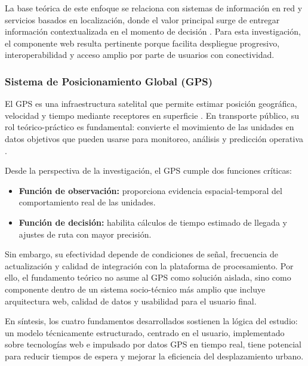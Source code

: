La base teórica de este enfoque se relaciona con sistemas de información en red y servicios basados en localización, donde el valor principal surge de entregar información contextualizada en el momento de decisión \cite{varshney2002}. Para esta investigación, el componente web resulta pertinente porque facilita despliegue progresivo, interoperabilidad y acceso amplio por parte de usuarios con conectividad.

\subsubsection{Sistema de Posicionamiento Global (GPS)}

El GPS es una infraestructura satelital que permite estimar posición geográfica, velocidad y tiempo mediante receptores en superficie \cite{elrabbany2006}. En transporte público, su rol teórico-práctico es fundamental: convierte el movimiento de las unidades en datos objetivos que pueden usarse para monitoreo, análisis y predicción operativa \cite{schiller2004,gonzalez2004}.

Desde la perspectiva de la investigación, el GPS cumple dos funciones críticas:
\begin{itemize}
    \item \textbf{Función de observación:} proporciona evidencia espacial-temporal del comportamiento real de las unidades.
    \item \textbf{Función de decisión:} habilita cálculos de tiempo estimado de llegada y ajustes de ruta con mayor precisión.
\end{itemize}

Sin embargo, su efectividad depende de condiciones de señal, frecuencia de actualización y calidad de integración con la plataforma de procesamiento. Por ello, el fundamento teórico no asume al GPS como solución aislada, sino como componente dentro de un sistema socio-técnico más amplio que incluye arquitectura web, calidad de datos y usabilidad para el usuario final.

En síntesis, los cuatro fundamentos desarrollados sostienen la lógica del estudio: un modelo técnicamente estructurado, centrado en el usuario, implementado sobre tecnologías web e impulsado por datos GPS en tiempo real, tiene potencial para reducir tiempos de espera y mejorar la eficiencia del desplazamiento urbano.